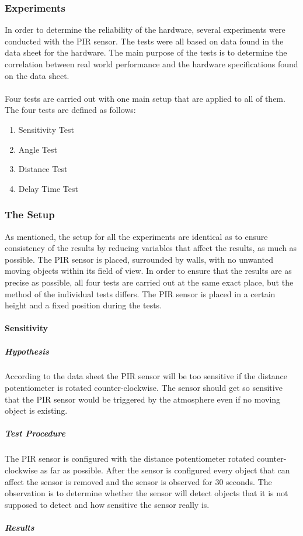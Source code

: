 \subsubsection{Experiments}
\label{sub:Experiments}
In order to determine the reliability of the hardware, several experiments were conducted with the PIR sensor.
The tests were all based on data found in the data sheet for the hardware.
The main purpose of the tests is to determine the correlation between real world performance and the hardware specifications
found on the data sheet.
\\\\
Four tests are carried out with one main setup that are applied to all of them. The four tests are defined as follows:

\begin{enumerate}
  \item Sensitivity Test
  \item Angle Test
  \item Distance Test
  \item Delay Time Test
\end{enumerate}

\subsubsection{The Setup}
\label{subs:The Setup}
As mentioned, the setup for all the experiments are identical as to ensure
consistency of the results by reducing variables that affect the results, as
much as possible. The PIR sensor is placed, surrounded by walls, with no unwanted
moving objects within its field of view. In order to ensure that the results are
as precise as possible, all four tests are carried out at the same exact place,
but the method of the individual tests differs. The PIR sensor is placed in a
certain height and a fixed position during the tests.

\paragraph{Sensitivity}
\label{par:Sensitivity}

\subparagraph{Hypothesis}
\label{subp:SenHypothesis}
According to the data sheet the PIR sensor will be too sensitive if the distance potentiometer is rotated counter-clockwise.
The sensor should get so sensitive that the PIR sensor would be triggered by the atmosphere even
if no moving object is existing\cite{datasheet_pir1}.
\subparagraph{Test Procedure}
\label{subp:SenTest Procedure}
The PIR sensor is configured with the distance potentiometer rotated
counter-clockwise as far as possible.
After the sensor is configured every object that can affect the sensor is
removed and the sensor is observed for 30 seconds.
The observation is to determine whether the sensor will detect objects that it is not
supposed to detect and how sensitive the sensor really is.
\subparagraph{Results}
\label{subp:SenResults}

